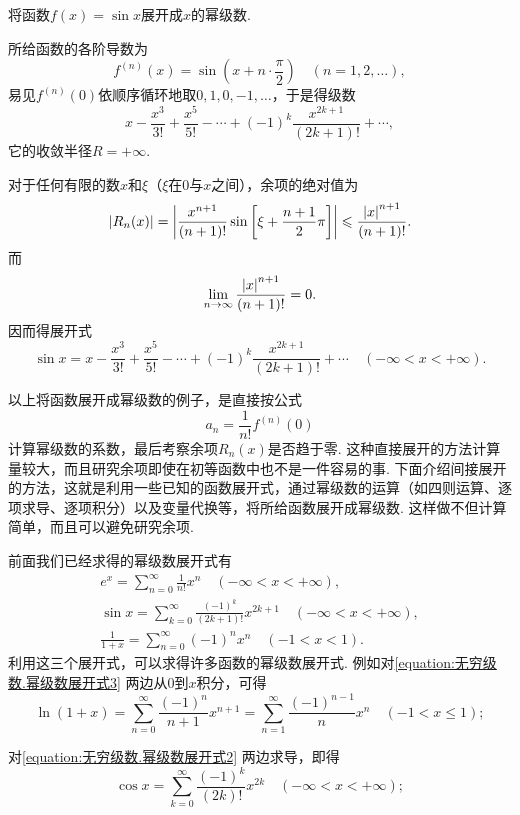 \begin{example}
将函数\(f(x) = \sin x\)展开成\(x\)的幂级数.
\begin{solution}
所给函数的各阶导数为\[
f^{(n)}(x) = \sin\left(x + n\cdot\frac{\pi}{2}\right)
\quad(n=1,2,\dotsc),
\]易见\(f^{(n)}(0)\)依顺序循环地取\(0,1,0,-1,\dotsc\)，于是得级数\[
x-\frac{x^3}{3!}+\frac{x^5}{5!}-\dotsb+(-1)^k \frac{x^{2k+1}}{(2k+1)!}+\dotsb,
\]它的收敛半径\(R=+\infty\).

对于任何有限的数\(x\)和\(\xi\)（\(\xi\)在\(0\)与\(x\)之间），余项的绝对值为\[
\abs{R_n(x)}
= \abs{ \frac{x^{n+1}}{(n+1)!} \sin\left[\xi+\frac{n+1}{2}\pi\right] }
\leqslant \frac{\abs{x}^{n+1}}{(n+1)!}.
\]而\[
\lim\limits_{n\to\infty} \frac{\abs{x}^{n+1}}{(n+1)!} = 0.
\]因而得展开式\[
\sin x = x-\frac{x^3}{3!}+\frac{x^5}{5!}-\dotsb+(-1)^k \frac{x^{2k+1}}{(2k+1)!}+\dotsb
\quad (-\infty<x<+\infty).
\]
\end{solution}
\end{example}

以上将函数展开成幂级数的例子，是直接按公式\[
a_n = \frac{1}{n!} f^{(n)}(0)
\]计算幂级数的系数，最后考察余项\(R_n(x)\)是否趋于零.
这种直接展开的方法计算量较大，而且研究余项即使在初等函数中也不是一件容易的事.
下面介绍间接展开的方法，这就是利用一些已知的函数展开式，通过幂级数的运算（如四则运算、逐项求导、逐项积分）以及变量代换等，将所给函数展开成幂级数.
这样做不但计算简单，而且可以避免研究余项.

前面我们已经求得的幂级数展开式有\begin{gather}
e^x = \sum\limits_{n=0}^{\infty} \frac{1}{n!} x^n
	\quad (-\infty<x<+\infty), \label{equation:无穷级数.幂级数展开式1} \\
\sin x = \sum\limits_{k=0}^{\infty} \frac{(-1)^k}{(2k+1)!} x^{2k+1}
	\quad (-\infty<x<+\infty), \label{equation:无穷级数.幂级数展开式2} \\
\frac{1}{1+x} = \sum\limits_{n=0}^{\infty} (-1)^n x^n
	\quad (-1<x<1). \label{equation:无穷级数.幂级数展开式3}
\end{gather}
利用这三个展开式，可以求得许多函数的幂级数展开式.
例如对\cref{equation:无穷级数.幂级数展开式3} 两边从\(0\)到\(x\)积分，可得
\begin{equation}\label{equation:无穷级数.幂级数展开式4}
\ln(1+x) = \sum\limits_{n=0}^{\infty} \frac{(-1)^n}{n+1} x^{n+1}
= \sum\limits_{n=1}^{\infty} \frac{(-1)^{n-1}}{n} x^n
\quad (-1<x\leqslant1);
\end{equation}

对\cref{equation:无穷级数.幂级数展开式2} 两边求导，即得
\begin{equation}\label{equation:无穷级数.幂级数展开式5}
\cos x = \sum\limits_{k=0}^{\infty} \frac{(-1)^k}{(2k)!} x^{2k}
\quad (-\infty<x<+\infty);
\end{equation}


